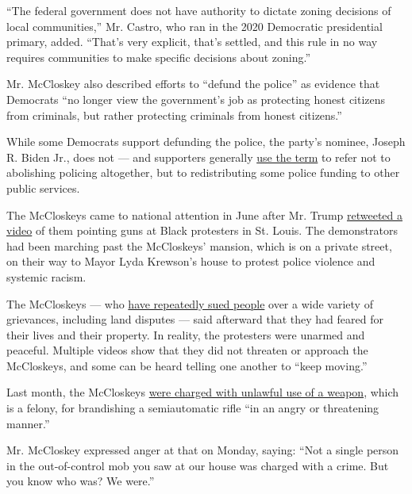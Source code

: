 ``The federal government does not have authority to dictate zoning
decisions of local communities,'' Mr. Castro, who ran in the 2020
Democratic presidential primary, added. ``That's very explicit, that's
settled, and this rule in no way requires communities to make specific
decisions about zoning.''

Mr. McCloskey also described efforts to ``defund the police'' as
evidence that Democrats ``no longer view the government's job as
protecting honest citizens from criminals, but rather protecting
criminals from honest citizens.''

While some Democrats support defunding the police, the party's nominee,
Joseph R. Biden Jr., does not --- and supporters generally
\href{https://www.nytimes3xbfgragh.onion/2020/06/08/us/what-does-defund-police-mean.html}{use
the term} to refer not to abolishing policing altogether, but to
redistributing some police funding to other public services.

The McCloskeys came to national attention in June after Mr. Trump
\href{https://www.nytimes3xbfgragh.onion/2020/06/29/us/politics/trump-white-couple-protesters.html}{retweeted
a video} of them pointing guns at Black protesters in St. Louis. The
demonstrators had been marching past the McCloskeys' mansion, which is
on a private street, on their way to Mayor Lyda Krewson's house to
protest police violence and systemic racism.

The McCloskeys --- who
\href{https://www.stltoday.com/news/local/metro/portland-place-couple-who-confronted-protesters-have-a-long-history-of-not-backing-down/article_281d9989-373e-53c3-abcb-ecd0225dd287.html}{have
repeatedly sued people} over a wide variety of grievances, including
land disputes --- said afterward that they had feared for their lives
and their property. In reality, the protesters were unarmed and
peaceful. Multiple videos show that they did not threaten or approach
the McCloskeys, and some can be heard telling one another to ``keep
moving.''

Last month, the McCloskeys
\href{https://www.nytimes3xbfgragh.onion/2020/07/20/us/mark-patricia-mccloskey-charges.html}{were
charged with unlawful use of a weapon}, which is a felony, for
brandishing a semiautomatic rifle ``in an angry or threatening manner.''

Mr. McCloskey expressed anger at that on Monday, saying: ``Not a single
person in the out-of-control mob you saw at our house was charged with a
crime. But you know who was? We were.''

